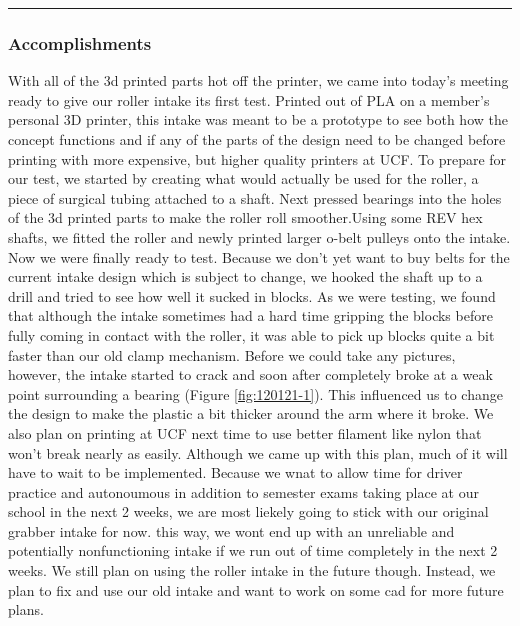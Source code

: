 \noindent\hfil\rule{\textwidth}{.4pt}\hfil

\subsubsection*{Accomplishments}
With all of the 3d printed parts hot off the printer, we came into today’s meeting ready to give our roller intake its first test. Printed out of PLA on a member’s personal 3D printer, this intake was meant to be a prototype to see both how  the concept functions and if any of the parts of the design need to be changed before printing with more expensive, but higher quality printers at UCF. To prepare for our test, we started by creating what would actually be used for the roller, a piece of surgical tubing attached to a shaft. Next pressed bearings into the holes of the 3d printed parts to make the roller roll smoother.Using some REV hex shafts, we fitted the roller and newly printed larger o-belt pulleys onto the intake. Now we were finally ready to test. Because we don’t yet want to buy belts for the current intake design which is subject to change, we hooked the shaft up to a drill and tried to see how well it sucked in blocks. As we were testing, we found that although the intake sometimes had a hard time gripping the blocks before fully coming in contact with the roller, it was able to pick up blocks quite a bit faster than our old clamp mechanism. Before we could take any pictures, however, the intake started to crack and soon after completely broke at a weak point surrounding a bearing (Figure \ref{fig:120121-1}). This influenced us to change the design to make the plastic a bit thicker around the arm where it broke. We also plan on printing at UCF next time to use better filament like nylon that won't break nearly as easily. Although we came up with this plan, much of it will have to wait to be implemented. Because we wnat to allow time for driver practice and autonoumous in addition to semester exams taking place at our school in the next 2 weeks, we are most liekely going to stick with our original grabber intake for now. this way, we wont end up with an unreliable and potentially nonfunctioning intake if we run out of time completely in the next 2 weeks. We still plan on using the roller intake in the future though. Instead, we plan to fix and use our old intake and want to work on some cad for more future plans.

